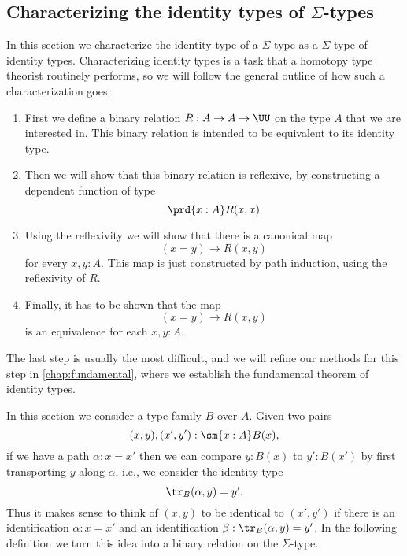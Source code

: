 \subsection{Characterizing the identity types of \texorpdfstring{$\Sigma$-}{dependent pair }types}

In this section we characterize the identity type of a $\Sigma$-type as a $\Sigma$-type of identity types. Characterizing identity types is a task that a homotopy type theorist routinely performs, so we will follow the general outline of how such a characterization goes:
\begin{enumerate}
\item First we define a binary relation $R:A\to A\to \UU$ on the type $A$ that we are interested in. This binary relation is intended to be equivalent to its identity type.
\item Then we will show that this binary relation is reflexive, by constructing a dependent function of type
  \begin{equation*}
    \prd{x:A}R(x,x)
  \end{equation*}
\item Using the reflexivity we will show that there is a canonical map
  \begin{equation*}
    (x=y)\to R(x,y)
  \end{equation*}
  for every $x,y:A$. This map is just constructed by path induction, using the reflexivity of $R$.
\item Finally, it has to be shown that the map
  \begin{equation*}
    (x=y)\to R(x,y)
  \end{equation*}
  is an equivalence for each $x,y:A$. 
\end{enumerate}
The last step is usually the most difficult, and we will refine our methods for this step in \cref{chap:fundamental}, where we establish the fundamental theorem of identity types.

In this section we consider a type family $B$ over $A$. Given two pairs
\begin{equation*}
  (x,y),(x',y'):\sm{x:A}B(x),
\end{equation*}
if we have a path $\alpha:x=x'$ then we can compare $y:B(x)$ to $y':B(x')$ by first transporting $y$ along $\alpha$, i.e., we consider the identity type
\begin{equation*}
  \tr_B(\alpha,y)=y'.
\end{equation*}
Thus it makes sense to think of $(x,y)$ to be identical to $(x',y')$ if there is an identification $\alpha:x=x'$ and an identification $\beta:\tr_B(\alpha,y)=y'$. In the following definition we turn this idea into a binary relation on the $\Sigma$-type.

